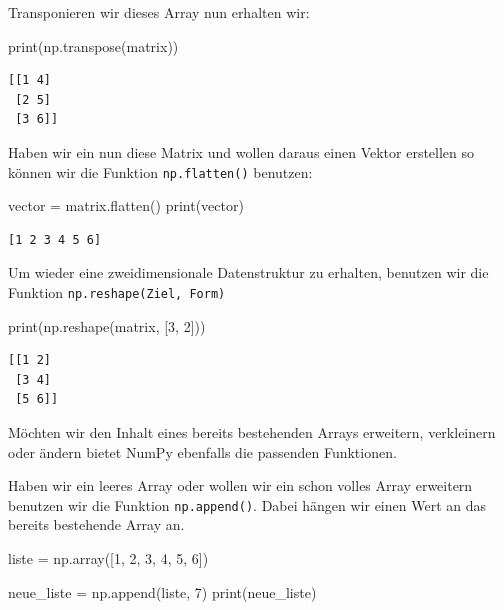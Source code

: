 \documentclass[
  letterpaper,
  DIV=11,
  numbers=noendperiod]{scrreprt}
\newenvironment{Shaded}{\begin{snugshade}}{\end{snugshade}}
\newcommand{\BuiltInTok}[1]{\textcolor[rgb]{0.00,0.23,0.31}{#1}}
\newcommand{\DecValTok}[1]{\textcolor[rgb]{0.68,0.00,0.00}{#1}}
\newcommand{\NormalTok}[1]{\textcolor[rgb]{0.00,0.23,0.31}{#1}}
\newcommand{\OperatorTok}[1]{\textcolor[rgb]{0.37,0.37,0.37}{#1}}
\begin{document}
Transponieren wir dieses Array nun erhalten wir:

\begin{Shaded}
\begin{Highlighting}[]
\BuiltInTok{print}\NormalTok{(np.transpose(matrix))}
\end{Highlighting}
\end{Shaded}

\begin{verbatim}
[[1 4]
 [2 5]
 [3 6]]
\end{verbatim}

Haben wir ein nun diese Matrix und wollen daraus einen Vektor erstellen
so können wir die Funktion \texttt{np.flatten()} benutzen:

\begin{Shaded}
\begin{Highlighting}[]
\NormalTok{vector }\OperatorTok{=}\NormalTok{ matrix.flatten()}
\BuiltInTok{print}\NormalTok{(vector)}
\end{Highlighting}
\end{Shaded}

\begin{verbatim}
[1 2 3 4 5 6]
\end{verbatim}

Um wieder eine zweidimensionale Datenstruktur zu erhalten, benutzen wir
die Funktion \texttt{np.reshape(Ziel,\ Form)}

\begin{Shaded}
\begin{Highlighting}[]
\BuiltInTok{print}\NormalTok{(np.reshape(matrix, [}\DecValTok{3}\NormalTok{, }\DecValTok{2}\NormalTok{]))}
\end{Highlighting}
\end{Shaded}

\begin{verbatim}
[[1 2]
 [3 4]
 [5 6]]
\end{verbatim}

Möchten wir den Inhalt eines bereits bestehenden Arrays erweitern,
verkleinern oder ändern bietet NumPy ebenfalls die passenden Funktionen.

Haben wir ein leeres Array oder wollen wir ein schon volles Array
erweitern benutzen wir die Funktion \texttt{np.append()}. Dabei hängen
wir einen Wert an das bereits bestehende Array an.

\begin{Shaded}
\begin{Highlighting}[]
\NormalTok{liste }\OperatorTok{=}\NormalTok{ np.array([}\DecValTok{1}\NormalTok{, }\DecValTok{2}\NormalTok{, }\DecValTok{3}\NormalTok{, }\DecValTok{4}\NormalTok{, }\DecValTok{5}\NormalTok{, }\DecValTok{6}\NormalTok{])}

\NormalTok{neue\_liste }\OperatorTok{=}\NormalTok{ np.append(liste, }\DecValTok{7}\NormalTok{)}
\BuiltInTok{print}\NormalTok{(neue\_liste)}
\end{Highlighting}
\end{Shaded}
\end{document}
